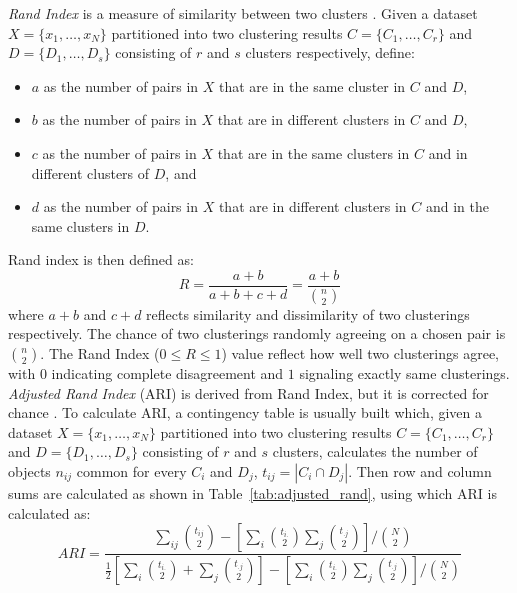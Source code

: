 \textit{Rand Index} is a measure of similarity between two clusters \citep{santos2009use}.
Given a dataset $X = \{x_1, \dots, x_N\}$ partitioned into two clustering results
$C = \{C_1, \dots, C_r\}$ and $D = \{D_1, \dots, D_s\}$ consisting of $r$ and $s$ clusters
respectively, define:
\begin{itemize}
\item $a$ as the number of pairs in $X$ that are in the same cluster in $C$ and $D$,
\item $b$ as the number of pairs in $X$ that are in different clusters in $C$ and $D$,
\item $c$ as the number of pairs in $X$ that are in the same clusters in $C$ and in different clusters of $D$, and
\item $d$ as the number of pairs in $X$ that are in different clusters in $C$ and in the same clusters in $D$. 
\end{itemize}
Rand index is then defined as:
\begin{equation}\label{eq:rand_index}
	R = \frac{a + b}{a + b + c + d} = \frac{a + b}{\binom{n}{2}}
\end{equation}
where $a + b$ and $c + d$ reflects similarity and dissimilarity of two clusterings respectively.  
The chance of two clusterings
randomly agreeing on a chosen pair is  $\binom{n}{2}$.
The Rand Index ($0 \leq R \leq 1$) value reflect how well two clusterings agree, with 
$0$ indicating complete disagreement and $1$ signaling exactly same clusterings. 
\textit{Adjusted Rand Index} (ARI) is derived from Rand Index, but it is corrected for chance
\citep{steinley2004properties}. To calculate ARI, a contingency table is usually built which, 
given a dataset $X = \{x_1, \dots, x_N\}$ partitioned into two clustering
results $C = \{C_1, \dots, C_r\}$ and $D = \{D_1, \dots, D_s\}$ consisting of
$r$ and $s$ clusters, calculates the number of objects $n_{ij}$ common for every
$C_i$ and $D_j$, $t_{ij} = |C_i \cap D_j|$. Then row and column sums are calculated 
as shown in Table~\ref{tab:adjusted_rand}, using which ARI is calculated as:
\begin{equation}\label{eq:adjusted_rand_index}
	ARI = \frac{\sum_{ij} \binom{t_{ij}}{2}- \left[ \sum_i \binom{t_{i.}}{2} \sum_j \binom{t_{.j}}{2} \right] / \binom{N}{2}}
	{\frac{1}{2} \left[ \sum_i \binom{t_{i.}}{2} + \sum_j \binom{t_{.j}}{2} \right] - 
	\left[ \sum_i \binom{t_{i.}}{2} \sum_j \binom{t_{.j}}{2} \right] / \binom{N}{2}
	}
\end{equation}

